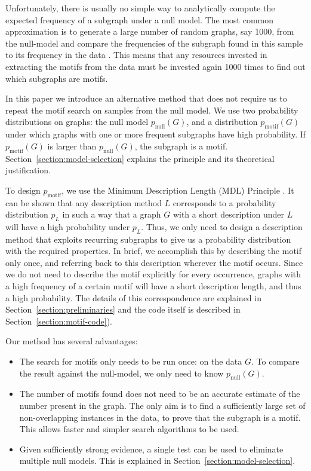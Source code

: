 Unfortunately, there is usually no simple way to analytically compute the expected frequency of a subgraph under a null model. The most common approximation is to generate a large number of random graphs, say 1000, from the null-model and compare the frequencies of the subgraph found in this sample to its frequency in the data \cite{milo2002network}. This means that any resources invested in extracting the motifs from the data must be invested again 1000 times to find out which subgraphs are motifs.

In this paper we introduce an alternative method that does not require us to repeat the motif search on samples from the null model. We use two probability distributions on graphs: the null model $p_\text{null}(G)$, and a distribution $p_\text{motif}(G)$ under which graphs with one or more frequent subgraphs have high probability. If $p_\text{motif}(G)$ is larger than $p_\text{null}(G)$, the subgraph is a motif. Section~\ref{section:model-selection} explains the principle and its theoretical justification.

To design $p_\text{motif}$, we use the Minimum Description Length (MDL) Principle \cite{rissanen1978modeling,grunwald2007minimum}. It can be shown that any description method $L$ corresponds to a probability distribution $p_L$ in such a way that a graph $G$ with a short description under $L$ will have a high probability under $p_L$. Thus, we only need to design a description method that exploits recurring subgraphs to give us a probability distribution with the required properties. In brief, we accomplish this by describing the motif only once, and referring back to this description wherever the motif occurs. Since we do not need to describe the motif explicitly for every occurrence, graphs with a high frequency of a certain motif will have a short description length, and thus a high probability. The details of this correspondence are explained in Section~\ref{section:preliminaries} and the code itself is described in Section~\ref{section:motif-code}).

Our method has several advantages:
\begin{itemize}
  \item The search for motifs only needs to be run once: on the data $G$. To compare the result against the null-model, we only need to know $p_\text{null}(G)$. 
  \item The number of motifs found does not need to be an accurate estimate of the number present in the graph. The only aim is to find a sufficiently large set of non-overlapping instances in the data, to prove that the subgraph is a motif. This allows faster and simpler search algorithms to be used.
  \item Given sufficiently strong evidence, a single test can be used to eliminate multiple null models. This is explained in Section~\ref{section:model-selection}.
\end{itemize}

